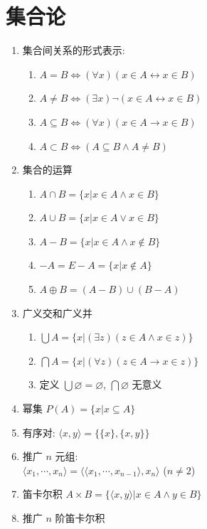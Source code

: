 \documentclass[11pt,a4paper,twocolumn,fleqn]{article} %
\renewcommand{\emptyset}{\varnothing}
\begin{document}
\section{集合论} %
\label{sec:set_theory}
\begin{enumerate}
	\item 集合间关系的形式表示: 
	\begin{enumerate}
		\item $A = B \Leftrightarrow (\forall x)(x\in A \leftrightarrow x \in B)$
		\item $A \neq B \Leftrightarrow 
		(\exists x)\lnot(x\in A \leftrightarrow x \in B)$
		\item $A \subseteq B\Leftrightarrow (\forall x)(x\in A\to x \in B)$
		\item $A \subset B\Leftrightarrow (A\subseteq B \land A\neq B)$
	\end{enumerate}
	\item 集合的运算
	\begin{enumerate}
		\item $A\cap B = \{x|x\in A \land x\in B\}$
		\item $A\cup B = \{x|x\in A \lor x\in B\}$
		\item $A - B = \{x|x\in A\land x\notin B\}$
		\item $-A = E-A = \{x|x\notin A\}$
		\item $A\oplus B = (A - B)\cup (B - A)$
	\end{enumerate}
	\item 广义交和广义并
	\begin{enumerate}
		\item $\bigcup A = \{x|(\exists z)(z\in A\land x\in z)\}$
		\item $\bigcap A = \{x|(\forall z)(z\in A\to x\in z)\}$
		\item 定义 $\bigcup\emptyset = \emptyset$, $\bigcap\emptyset$ 无意义
	\end{enumerate}
	\item 幂集 $P(A) = \{x|x\subseteq A\}$
	\item 有序对: $\langle x, y \rangle = \{\{x\}, \{x, y\}\}$
	\item 推广 $n$ 元组: \\ $\langle x_1, \cdots, x_n\rangle 
	= \langle\langle x_1, \cdots, x_{n-1}\rangle, x_n\rangle$ ($n\neq 2$)
	\item 笛卡尔积 $A\times B = \{\langle x, y \rangle|x\in A\land y\in B\}$
	\item 推广 $n$ 阶笛卡尔积\\

\end{enumerate}
\end{document}
